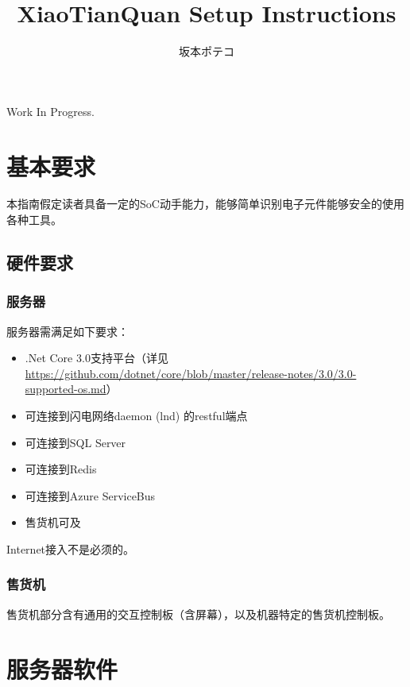 \documentclass[a4paper,11pt]{article}
\theoremstyle{definition}
\begin{document}
\title{\Huge{XiaoTianQuan Setup Instructions}}
\author{坂本ポテコ}
\maketitle
\clearpage

\tableofcontents
\clearpage


{\Huge{Work In Progress.}}

\section{基本要求}

    本指南假定读者具备一定的SoC动手能力，能够简单识别电子元件能够安全的使用各种工具。

\subsection{硬件要求}

\subsubsection{服务器}

服务器需满足如下要求：

\begin{itemize}
  \item .Net Core 3.0支持平台（详见 \url{https://github.com/dotnet/core/blob/master/release-notes/3.0/3.0-supported-os.md}）
  \item 可连接到闪电网络daemon (lnd) 的restful端点
  \item 可连接到SQL Server
  \item 可连接到Redis
  \item 可连接到Azure ServiceBus
  \item 售货机可及
\end{itemize}

Internet接入不是必须的。

\subsubsection{售货机}

售货机部分含有通用的交互控制板（含屏幕），以及机器特定的售货机控制板。



\section{服务器软件}
\end{document}
